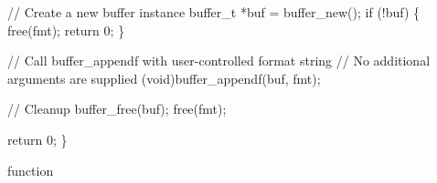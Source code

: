 \documentclass[
  a4paper,
]{scrreprt}
\newenvironment{Shaded}{\begin{snugshade}}{\end{snugshade}}
\newcommand{\CommentTok}[1]{\textcolor[rgb]{0.41,0.41,0.41}{#1}}
\newcommand{\ControlFlowTok}[1]{\textcolor[rgb]{0.85,0.12,0.09}{#1}}
\newcommand{\DataTypeTok}[1]{\textcolor[rgb]{0.47,0.16,0.63}{#1}}
\newcommand{\DecValTok}[1]{\textcolor[rgb]{0.47,0.16,0.63}{#1}}
\newcommand{\NormalTok}[1]{\textcolor[rgb]{0.33,0.33,0.33}{#1}}
\newcommand{\OperatorTok}[1]{\textcolor[rgb]{0.00,0.46,0.62}{#1}}
\theoremstyle{definition}
\theoremstyle{remark}
\begin{document}
\begin{Shaded}
\begin{Highlighting}[numbers=left,,]
    \CommentTok{// Create a new buffer instance}
\NormalTok{    buffer\_t }\OperatorTok{*}\NormalTok{buf }\OperatorTok{=}\NormalTok{ buffer\_new}\OperatorTok{();}
    \ControlFlowTok{if} \OperatorTok{(!}\NormalTok{buf}\OperatorTok{)} \OperatorTok{\{}
\NormalTok{        free}\OperatorTok{(}\NormalTok{fmt}\OperatorTok{);}
        \ControlFlowTok{return} \DecValTok{0}\OperatorTok{;}
    \OperatorTok{\}}

    \CommentTok{// Call buffer\_appendf with user{-}controlled format string}
    \CommentTok{// No additional arguments are supplied}
    \OperatorTok{(}\DataTypeTok{void}\OperatorTok{)}\NormalTok{buffer\_appendf}\OperatorTok{(}\NormalTok{buf}\OperatorTok{,}\NormalTok{ fmt}\OperatorTok{);}

    \CommentTok{// Cleanup}
\NormalTok{    buffer\_free}\OperatorTok{(}\NormalTok{buf}\OperatorTok{);}
\NormalTok{    free}\OperatorTok{(}\NormalTok{fmt}\OperatorTok{);}

    \ControlFlowTok{return} \DecValTok{0}\OperatorTok{;}
\OperatorTok{\}}
\end{Highlighting}
\end{Shaded}

function
\end{document}
